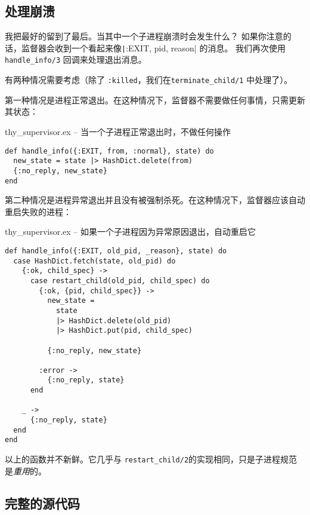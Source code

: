  \subsection{ 处理崩溃}

我把最好的留到了最后。当其中一个子进程崩溃时会发生什么？
如果你注意的话，监督器会收到一个看起来像\texttt|{:EXIT, pid, reason}| 的消息。
我们再次使用\texttt{handle\_info/3} 回调来处理退出消息。

有两种情况需要考虑（除了 \texttt{:killed}，我们在\texttt{terminate\_child/1} 中处理了）。

第一种情况是进程正常退出。在这种情况下，监督器不需要做任何事情，只需更新其状态：

\begin{code}{thy\_supervisor.ex -- 当一个子进程正常退出时，不做任何操作}
\begin{verbatim}
def handle_info({:EXIT, from, :normal}, state) do
  new_state = state |> HashDict.delete(from)
  {:no_reply, new_state}
end
\end{verbatim}
\label{lst:handle_normal_exit}
\end{code}

第二种情况是进程异常退出并且没有被强制杀死。在这种情况下，监督器应该自动重启失败的进程：

\begin{code}{thy\_supervisor.ex -- 如果一个子进程因为异常原因退出，自动重启它}
\begin{verbatim}
def handle_info({:EXIT, old_pid, _reason}, state) do
  case HashDict.fetch(state, old_pid) do
    {:ok, child_spec} ->
      case restart_child(old_pid, child_spec) do
        {:ok, {pid, child_spec}} ->
          new_state =
            state
            |> HashDict.delete(old_pid)
            |> HashDict.put(pid, child_spec)

          {:no_reply, new_state}

        :error ->
          {:no_reply, state}
      end

    _ ->
      {:no_reply, state}
  end
end
\end{verbatim}
\label{lst:handle_abnormal_exit}
\end{code}

以上的函数并不新鲜。它几乎与 \texttt{restart\_child/2}的实现相同，只是子进程规范是\emph{重用}的。

\subsection{完整的源代码}

